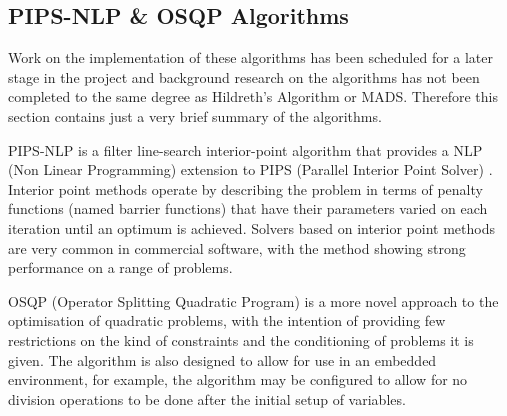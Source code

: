 %
%

\subsection{PIPS-NLP \& OSQP Algorithms}
Work on the implementation of these algorithms has been scheduled for a later stage in the project and background research on the algorithms has not been completed to the same degree as Hildreth's Algorithm or MADS. Therefore this section contains just a very brief summary of the algorithms.

PIPS-NLP is a filter line-search interior-point algorithm that provides a NLP (Non Linear Programming) extension to PIPS (Parallel Interior Point Solver) \cite{ChiangStructuredPIPS-NLP}. Interior point methods operate by describing the problem in terms of penalty functions (named barrier functions) that have their parameters varied on each iteration until an optimum is achieved. Solvers based on interior point methods are very common in commercial software, with the method showing strong performance on a range of problems.

OSQP (Operator Splitting Quadratic Program) \cite{Stellato2017OSQP:Programs} is a more novel approach to the optimisation of quadratic problems, with the intention of providing few restrictions on the kind of constraints and the conditioning of problems it is given. The algorithm is also designed to allow for use in an embedded environment, for example, the algorithm may be configured to allow for no division operations to be done after the initial setup of variables.


